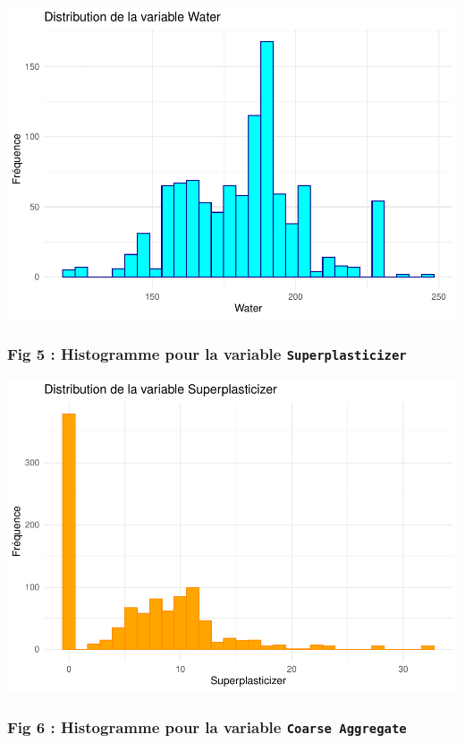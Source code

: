 \documentclass[
  12pt,
]{article}
\begin{document}
\includegraphics{rmd_final_files/figure-latex/unnamed-chunk-26-1.pdf}

\subsubsection{\texorpdfstring{Fig 5 : Histogramme pour la variable
\texttt{Superplasticizer}}{Fig 5 : Histogramme pour la variable Superplasticizer}}\label{fig-5-histogramme-pour-la-variable-superplasticizer}

\includegraphics{rmd_final_files/figure-latex/unnamed-chunk-27-1.pdf}

\subsubsection{\texorpdfstring{Fig 6 : Histogramme pour la variable
\texttt{Coarse\ Aggregate}}{Fig 6 : Histogramme pour la variable Coarse Aggregate}}\label{fig-6-histogramme-pour-la-variable-coarse-aggregate}
\end{document}

